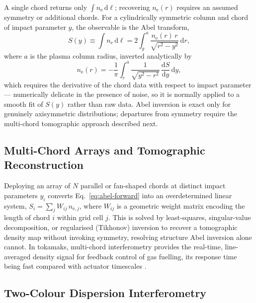 A single chord returns only $\int n_{\mathrm{e}}\,\mathrm{d}\ell$; recovering $n_{\mathrm{e}}(r)$ requires an assumed symmetry or additional chords. For a cylindrically symmetric column and chord of impact parameter $y$, the observable is the Abel transform,
\begin{equation}
S(y) \equiv \int n_{\mathrm{e}}\,\mathrm{d}\ell = 2\int_{y}^{a} \frac{n_{\mathrm{e}}(r)\,r}{\sqrt{r^{2}-y^{2}}}\,\mathrm{d}r,
\label{eq:abel-forward}
\end{equation}
where $a$ is the plasma column radius, inverted analytically by
\begin{equation}
n_{\mathrm{e}}(r) = -\frac{1}{\pi}\int_{r}^{a} \frac{1}{\sqrt{y^{2}-r^{2}}}\,\frac{\mathrm{d}S}{\mathrm{d}y}\,\mathrm{d}y,
\label{eq:abel-inverse}
\end{equation}
which requires the derivative of the chord data with respect to impact parameter — numerically delicate in the presence of noise, so it is normally applied to a smooth fit of $S(y)$ rather than raw data. Abel inversion is exact only for genuinely axisymmetric distributions; departures from symmetry require the multi-chord tomographic approach described next.

\subsection{Multi-Chord Arrays and Tomographic Reconstruction}

Deploying an array of $N$ parallel or fan-shaped chords at distinct impact parameters $y_{i}$ converts Eq.~\eqref{eq:abel-forward} into an overdetermined linear system, $S_{i} = \sum_{j} W_{ij}\, n_{\mathrm{e},j}$, where $W_{ij}$ is a geometric weight matrix encoding the length of chord $i$ within grid cell $j$. This is solved by least-squares, singular-value decomposition, or regularised (Tikhonov) inversion to recover a tomographic density map without invoking symmetry, resolving structure Abel inversion alone cannot. In tokamaks, multi-chord interferometry provides the real-time, line-averaged density signal for feedback control of gas fuelling, its response time being fast compared with actuator timescales \cite{ref0399}.

\subsection{Two-Colour Dispersion Interferometry}

